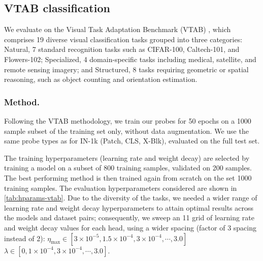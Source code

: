 \FloatBarrier
\subsection{VTAB classification}
\label{s:vtab}

We evaluate on the Visual Task Adaptation Benchmark (VTAB) \citep{Zhai2019_VTAB}, which comprises 19 diverse visual classification tasks grouped into three categories: Natural, 7 standard recognition tasks such as CIFAR-100, Caltech-101, and Flowers-102; Specialized, 4 domain-specific tasks including medical, satellite, and remote sensing imagery; and Structured, 8 tasks requiring geometric or spatial reasoning, such as object counting and orientation estimation.

\subsubsection{Method.}
Following the VTAB methodology, we train our probes for 50 epochs on a 1000 sample subset of the training set only, without data augmentation.
We use the same probe types as for IN-1k (Patch, CLS, X-Blk), evaluated on the full test set.

The training hyperparameters (learning rate and weight decay) are selected by training a model on a subset of 800 training samples, validated on 200 samples.
The best performing method is then trained again from scratch on the set 1000 training samples.
The evaluation hyperparameters considered are shown in \cref{tab:hparams-vtab}.
Due to the diversity of the tasks, we needed a wider range of learning rate and weight decay hyperparameters to attain optimal results across the models and dataset pairs; consequently, we sweep an 11 grid of learning rate and weight decay values for each head, using a wider spacing (factor of 3 spacing instead of 2):
$\eta_\text{max} \in [3\times10^{-5}, 1.5\times10^{-4}, 3\times10^{-4}, \cdots, 3.0]$
$\lambda \in [0, 1\times10^{-4}, 3\times10^{-4}, \cdots, 3.0]$.

